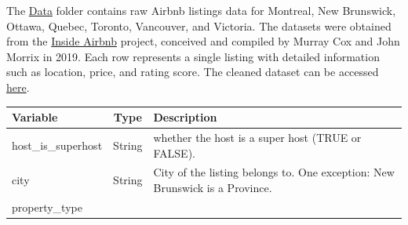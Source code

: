 \documentclass[
]{article}
\begin{document}
The
\href{https://github.com/STAT547-UBC-2019-20/group_3_mksm1228_sihaoyu1220/tree/master/Data}{Data}
folder contains raw Airbnb listings data for Montreal, New Brunswick,
Ottawa, Quebec, Toronto, Vancouver, and Victoria. The datasets were
obtained from the \href{http://insideairbnb.com/new-york-city/}{Inside
Airbnb} project, conceived and compiled by Murray Cox and John Morrix in
2019. Each row represents a single listing with detailed information
such as location, price, and rating score. The cleaned dataset can be
accessed
\href{https://github.com/STAT547-UBC-2019-20/group_3_mksm1228_sihaoyu1220/blob/master/Data/cleaned_data.csv}{here}.

\begin{longtable}[]{@{}lcl@{}}
\toprule
\begin{minipage}[b]{0.17\columnwidth}\raggedright
Variable\strut
\end{minipage} & \begin{minipage}[b]{0.22\columnwidth}\centering
Type\strut
\end{minipage} & \begin{minipage}[b]{0.53\columnwidth}\raggedright
Description\strut
\end{minipage}\tabularnewline
\midrule
\endhead
\begin{minipage}[t]{0.17\columnwidth}\raggedright
host\_is\_superhost\strut
\end{minipage} & \begin{minipage}[t]{0.22\columnwidth}\centering
String\strut
\end{minipage} & \begin{minipage}[t]{0.53\columnwidth}\raggedright
whether the host is a super host (TRUE or FALSE).\strut
\end{minipage}\tabularnewline
\begin{minipage}[t]{0.17\columnwidth}\raggedright
city\strut
\end{minipage} & \begin{minipage}[t]{0.22\columnwidth}\centering
String\strut
\end{minipage} & \begin{minipage}[t]{0.53\columnwidth}\raggedright
City of the listing belongs to. One exception: New Brunswick is a
Province.\strut
\end{minipage}\tabularnewline
\begin{minipage}[t]{0.17\columnwidth}\raggedright
property\_type\strut
\end{minipage} & \begin{minipage}[t]{0.22\columnwidth}\centering

\end{minipage}
\end{longtable}
\end{document}
